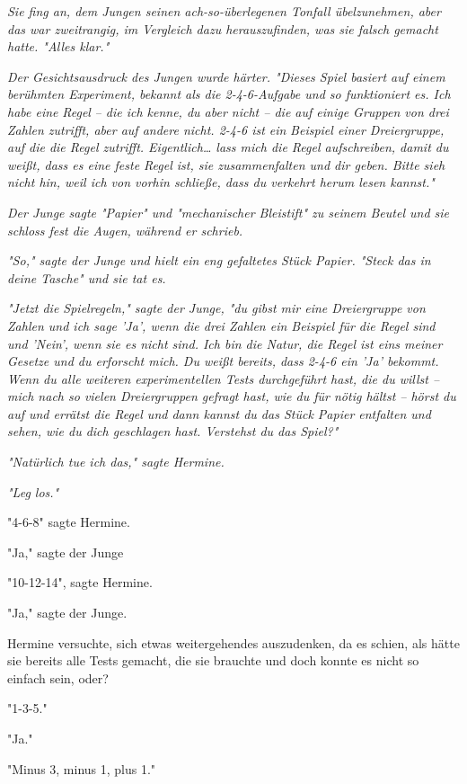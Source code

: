 {\emph{Sie fing an, dem Jungen seinen ach-so-überlegenen Tonfall übelzunehmen, aber das war zweitrangig, im Vergleich dazu herauszufinden, was sie falsch gemacht hatte. "Alles klar."}

\emph{Der Gesichtsausdruck des Jungen wurde härter. "Dieses Spiel basiert auf einem berühmten Experiment, bekannt als die 2-4-6-Aufgabe und so funktioniert es. Ich habe eine} \emph{\emph{Regel}} \emph{-- die ich kenne, du aber nicht -- die auf einige Gruppen von drei Zahlen zutrifft, aber auf andere nicht. 2-4-6 ist ein} \emph{Beispiel einer Dreiergruppe, auf die die Regel zutrifft. Eigentlich… lass mich die Regel aufschreiben, damit du weißt, dass es eine feste Regel ist, sie zusammenfalten und dir geben. Bitte sieh nicht hin, weil ich von vorhin schließe, dass du verkehrt herum lesen kannst."}

\emph{Der Junge sagte "Papier" und "mechanischer Bleistift" zu seinem Beutel und sie schloss fest die Augen, während er schrieb.}

\emph{"So," sagte der Junge und hielt ein eng gefaltetes Stück Papier. "Steck das in deine Tasche" und sie tat es.}

\emph{"Jetzt die Spielregeln," sagte der Junge, "du gibst mir eine Dreiergruppe von Zahlen und ich sage 'Ja', wenn die drei Zahlen ein Beispiel für die Regel sind und 'Nein', wenn sie es nicht sind. Ich bin die Natur, die Regel ist eins meiner Gesetze und du erforscht mich. Du weißt bereits, dass 2-4-6 ein 'Ja' bekommt. Wenn du alle weiteren experimentellen Tests durchgeführt hast, die du willst -- mich nach so vielen Dreiergruppen gefragt hast, wie du für nötig hältst -- hörst du auf und errätst die Regel und dann kannst du das Stück Papier entfalten und sehen, wie du dich geschlagen hast. Verstehst du das Spiel?"}

\emph{"Natürlich tue ich das," sagte Hermine.}

\emph{"Leg los."}

"4-6-8" sagte Hermine.

"Ja," sagte der Junge

"10-12-14", sagte Hermine.

"Ja," sagte der Junge.

Hermine versuchte, sich etwas weitergehendes auszudenken, da es schien, als hätte sie bereits alle Tests gemacht, die sie brauchte und doch konnte es nicht so einfach sein, oder?

"1-3-5."

"Ja."

"Minus 3, minus 1, plus 1."

}
